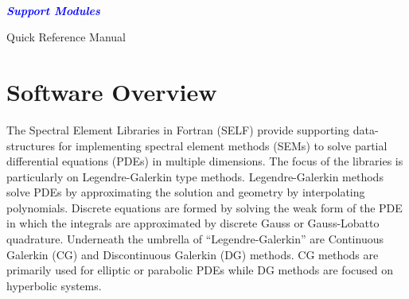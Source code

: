 \documentclass[12pt]{softwaremanual}
\author{Joseph Schoonover}
\title{}
\date{}
\begin{document}
\begin{titlingpage}
    
        \vspace*{2cm}
        
     \begin{flushright}
        {\selectfont
        \\
        }
       
        \vspace{1cm}
        
        \huge{
        \textbf{
        \textit{
        \textcolor{blue}{
           Support Modules
        }}}}
        
     \end{flushright}
         
        \vspace{2cm}
        
     \begin{center}
     
        {\selectfont
        \huge{
           Quick Reference Manual
        }
        
        \vspace{1.5cm}
        
        \textbf{
        \large{
           \theauthor 
         }}}
        
        \vfill
        
        
        \vspace{0.8cm}
        
     \end{center}
        
    
\end{titlingpage}



\tableofcontents

\pagestyle{myheadings}
\chapter{Software Overview}
The Spectral Element Libraries in Fortran (SELF) provide supporting data-structures for implementing spectral element methods (SEMs) to solve partial differential equations (PDEs) in multiple dimensions. The focus of the libraries is particularly on Legendre-Galerkin type methods. Legendre-Galerkin methods solve PDEs by approximating the solution and geometry by interpolating polynomials. Discrete equations are formed by solving the weak form of the PDE in which the integrals are approximated by discrete Gauss or Gauss-Lobatto quadrature. Underneath the umbrella of ``Legendre-Galerkin'' are Continuous Galerkin (CG) and Discontinuous Galerkin (DG) methods. CG methods are primarily used for elliptic or parabolic PDEs while DG methods are focused on hyperbolic systems.
\end{document}
